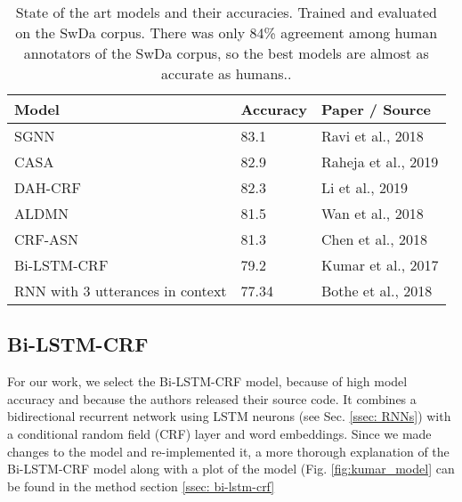     \begin{table}[h]
    \centering
    \begin{tabular}{|l|l|l|}
    \hline
    \textbf{Model}                   & \textbf{Accuracy} & \textbf{Paper / Source}      \\ \hline
    SGNN                             & 83.1              & Ravi et al., 2018 \cite{ravi2018self}   \\ \hline
    CASA                             & 82.9              & Raheja et al., 2019\cite{raheja2019dialogue} \\ \hline
    DAH-CRF                          & 82.3              & Li et al., 2019 \cite{li2018dual}     \\ \hline
    ALDMN                            & 81.5              & Wan et al., 2018 \cite{wan2018improved}    \\ \hline
    CRF-ASN                          & 81.3              & Chen et al., 2018 \cite{chen2018dialogue}   \\ \hline
    Bi-LSTM-CRF                      & 79.2              & Kumar et al., 2017 \cite{kumar2017dialogue}  \\ \hline
    RNN with 3 utterances in context & 77.34             & Bothe et al., 2018 \cite{bothe2018context}  \\ \hline
    \end{tabular}
    \caption{State of the art models and their accuracies. Trained and evaluated on the SwDa corpus. There was only 84\% agreement among human annotators of the SwDa corpus, so the best models are almost as accurate as humans.\cite{swda}.}
    \label{table: da models}
    \end{table}
    
    \subsection{Bi-LSTM-CRF \label{sssec: kumar model}}
    For our work, we select the Bi-LSTM-CRF model\cite{kumar2017dialogue}, because of high model accuracy and because the authors released their source code. It combines a bidirectional recurrent network using LSTM neurons (see Sec. \ref{ssec: RNNs}) with a conditional random field (CRF) layer and word embeddings. Since we made changes to the model and re-implemented it, a more thorough explanation of the Bi-LSTM-CRF model along with a plot of the model (Fig. \ref{fig:kumar_model} can be found in the method section \ref{ssec: bi-lstm-crf} %